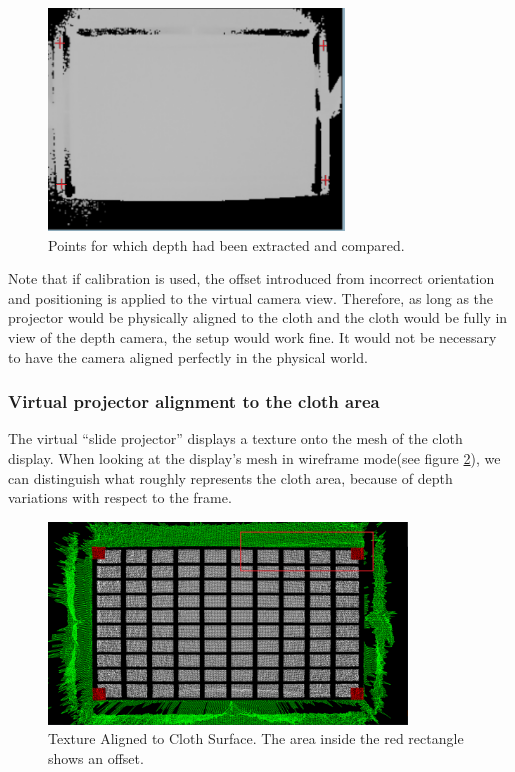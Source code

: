 \documentclass[]{article}
\begin{document}
  \begin{figure}[hbtp]
      \centering
      \includegraphics[width=0.7\textwidth]{figures/PointExtractionDepthMP.PNG}
      \caption{Points for which depth had been extracted and compared.}
      \label{fig:PointDepthExtraction}
  \end{figure}


Note that if calibration is used, the offset introduced from incorrect orientation and positioning is applied to the virtual camera view. Therefore, as long as the projector would be physically aligned to the cloth and the cloth would be fully in view of the depth camera, the setup would work fine. It would not be necessary to have the camera aligned perfectly in the physical world.

\subsubsection{Virtual projector alignment to the cloth area}

The virtual “slide projector” displays a texture onto the mesh of the cloth display. When looking at the display's mesh in wireframe mode(see figure \ref{fig:TextureAlignmentToMeshArea}), we can distinguish what roughly represents the cloth area, because of depth variations with respect to the frame. 

\begin{figure}[!hbtp]
    \centering
    \includegraphics[width=0.85\textwidth]{figures/TextureAlignmentToMeshArea.png}
    \caption{Texture Aligned to Cloth Surface. The area inside the red rectangle shows an offset.}
    \label{fig:TextureAlignmentToMeshArea}
\end{figure}
\end{document}
